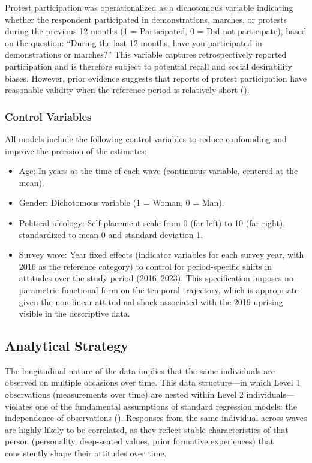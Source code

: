 \documentclass[
  13pt,
]{article}
\begin{document}
Protest participation was operationalized as a dichotomous variable
indicating whether the respondent participated in demonstrations,
marches, or protests during the previous 12 months (1 = Participated, 0
= Did not participate), based on the question: ``During the last 12
months, have you participated in demonstrations or marches?'' This
variable captures retrospectively reported participation and is
therefore subject to potential recall and social desirability biases.
However, prior evidence suggests that reports of protest participation
have reasonable validity when the reference period is relatively short
().

\subsubsection{Control Variables}\label{control-variables}

All models include the following control variables to reduce confounding
and improve the precision of the estimates:

\begin{itemize}
\item
  Age: In years at the time of each wave (continuous variable, centered
  at the mean).
\item
  Gender: Dichotomous variable (1 = Woman, 0 = Man).
\item
  Political ideology: Self-placement scale from 0 (far left) to 10 (far
  right), standardized to mean 0 and standard deviation 1.
\item
  Survey wave: Year fixed effects (indicator variables for each survey
  year, with 2016 as the reference category) to control for
  period-specific shifts in attitudes over the study period
  (2016--2023). This specification imposes no parametric functional form
  on the temporal trajectory, which is appropriate given the non-linear
  attitudinal shock associated with the 2019 uprising visible in the
  descriptive data.
\end{itemize}

\subsection{Analytical Strategy}\label{analytical-strategy}

The longitudinal nature of the data implies that the same individuals
are observed on multiple occasions over time. This data structure---in
which Level 1 observations (measurements over time) are nested within
Level 2 individuals---violates one of the fundamental assumptions of
standard regression models: the independence of observations
().
Responses from the same individual across waves are highly likely to be
correlated, as they reflect stable characteristics of that person
(personality, deep-seated values, prior formative experiences) that
consistently shape their attitudes over time.
\end{document}
